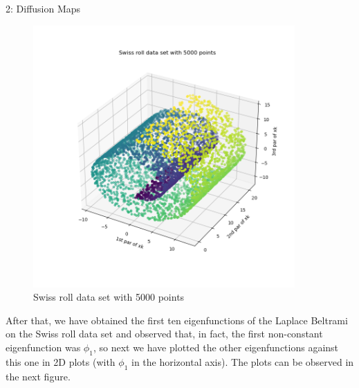 \documentclass[10pt,a4paper]{article}
\begin{document}
\begin{task}{2: Diffusion Maps}
\begin{figure} [H]
    \centering
    \includegraphics[width=10cm]{images/Swiss_roll_data_set.png}
    \caption{Swiss roll data set with 5000 points}
    \label{fig:task2-2-1}
\end{figure}

After that, we have obtained the first ten eigenfunctions of the Laplace Beltrami on the Swiss roll data set and observed that, in fact, the first non-constant eigenfunction was \(\phi_1 \), so next we have plotted the other eigenfunctions against this one in 2D plots (with \(\phi_1 \) in the horizontal axis). The plots can be observed in the next figure.

\newpage

\begin{figure} [H]
\centering
\end{figure}


\end{task}
\end{document}
